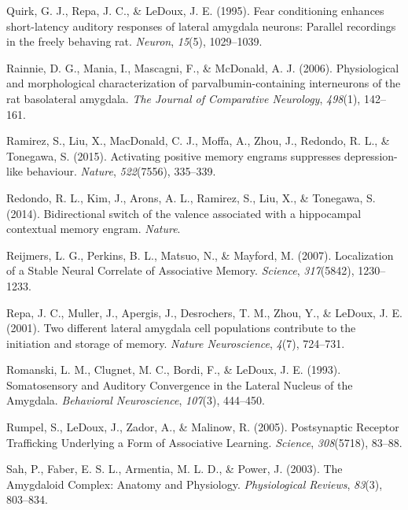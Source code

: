 \documentclass[12pt,a4paper,]{report}
\begin{document}
\hypertarget{ref-quirkux5ffearux5f1995}{}
Quirk, G. J., Repa, J. C., \& LeDoux, J. E. (1995). Fear conditioning
enhances short-latency auditory responses of lateral amygdala neurons:
Parallel recordings in the freely behaving rat. \emph{Neuron},
\emph{15}(5), 1029--1039.

\hypertarget{ref-rainnieux5fphysiologicalux5f2006}{}
Rainnie, D. G., Mania, I., Mascagni, F., \& McDonald, A. J. (2006).
Physiological and morphological characterization of
parvalbumin-containing interneurons of the rat basolateral amygdala.
\emph{The Journal of Comparative Neurology}, \emph{498}(1), 142--161.

\hypertarget{ref-ramirezux5factivatingux5f2015}{}
Ramirez, S., Liu, X., MacDonald, C. J., Moffa, A., Zhou, J., Redondo, R.
L., \& Tonegawa, S. (2015). Activating positive memory engrams
suppresses depression-like behaviour. \emph{Nature}, \emph{522}(7556),
335--339.

\hypertarget{ref-redondoux5fbidirectionalux5f2014}{}
Redondo, R. L., Kim, J., Arons, A. L., Ramirez, S., Liu, X., \&
Tonegawa, S. (2014). Bidirectional switch of the valence associated with
a hippocampal contextual memory engram. \emph{Nature}.

\hypertarget{ref-reijmersux5flocalizationux5f2007}{}
Reijmers, L. G., Perkins, B. L., Matsuo, N., \& Mayford, M. (2007).
Localization of a Stable Neural Correlate of Associative Memory.
\emph{Science}, \emph{317}(5842), 1230--1233.

\hypertarget{ref-repaux5ftwoux5f2001}{}
Repa, J. C., Muller, J., Apergis, J., Desrochers, T. M., Zhou, Y., \&
LeDoux, J. E. (2001). Two different lateral amygdala cell populations
contribute to the initiation and storage of memory. \emph{Nature
Neuroscience}, \emph{4}(7), 724--731.

\hypertarget{ref-romanskiux5fsomatosensoryux5f1993}{}
Romanski, L. M., Clugnet, M. C., Bordi, F., \& LeDoux, J. E. (1993).
Somatosensory and Auditory Convergence in the Lateral Nucleus of the
Amygdala. \emph{Behavioral Neuroscience}, \emph{107}(3), 444--450.

\hypertarget{ref-rumpelux5fpostsynapticux5f2005}{}
Rumpel, S., LeDoux, J., Zador, A., \& Malinow, R. (2005). Postsynaptic
Receptor Trafficking Underlying a Form of Associative Learning.
\emph{Science}, \emph{308}(5718), 83--88.

\hypertarget{ref-sahux5famygdaloidux5f2003}{}
Sah, P., Faber, E. S. L., Armentia, M. L. D., \& Power, J. (2003). The
Amygdaloid Complex: Anatomy and Physiology. \emph{Physiological
Reviews}, \emph{83}(3), 803--834.
\end{document}
